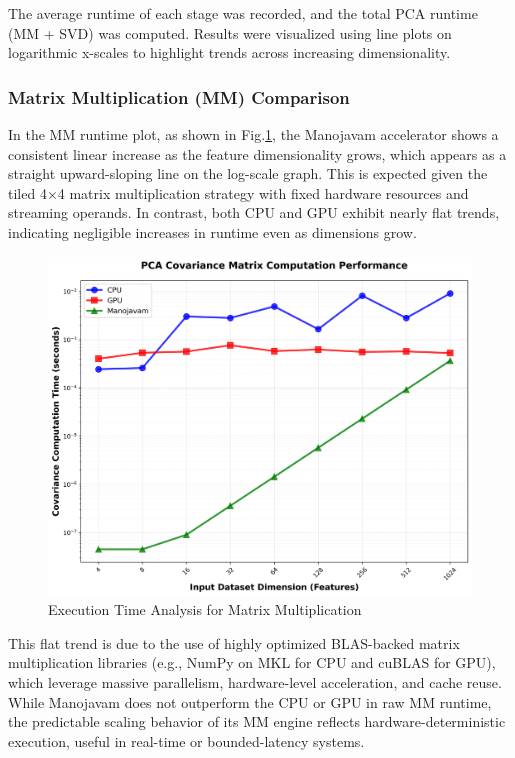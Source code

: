 The average runtime of each stage was recorded, and the total PCA runtime (MM + SVD) was computed. Results were visualized using line plots on logarithmic x-scales to highlight trends across increasing dimensionality.

\subsubsection{Matrix Multiplication (MM) Comparison}
In the MM runtime plot, as shown in Fig.\ref{fig:Execution Time Analysis for Matrix Multiplication}, the Manojavam accelerator shows a consistent linear increase as the feature dimensionality grows, which appears as a straight upward-sloping line on the log-scale graph. This is expected given the tiled 4×4 matrix multiplication strategy with fixed hardware resources and streaming operands. In contrast, both CPU and GPU exhibit nearly flat trends, indicating negligible increases in runtime even as dimensions grow.

\begin{figure}[H]
	\centerline{\includegraphics[scale = 0.50]{Figures/covariance_performance.png}}
	\caption{Execution Time Analysis for Matrix Multiplication}
	\label{fig:Execution Time Analysis for Matrix Multiplication}
\end{figure}

This flat trend is due to the use of highly optimized BLAS-backed matrix multiplication libraries (e.g., NumPy on MKL for CPU and cuBLAS for GPU), which leverage massive parallelism, hardware-level acceleration, and cache reuse. While Manojavam does not outperform the CPU or GPU in raw MM runtime, the predictable scaling behavior of its MM engine reflects hardware-deterministic execution, useful in real-time or bounded-latency systems.

